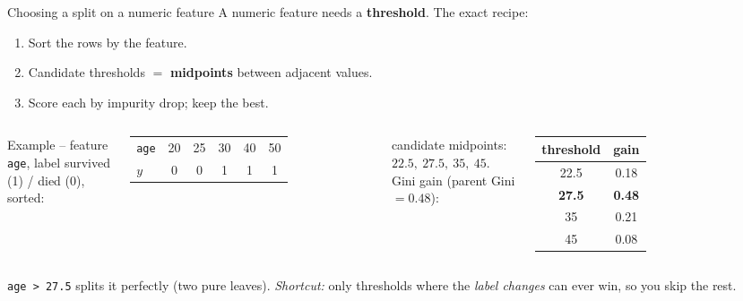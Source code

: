 \documentclass[aspectratio=169]{beamer}
\begin{document}
\begin{frame}{Choosing a split on a numeric feature}
  A numeric feature needs a \textbf{threshold}. The exact recipe:
  \begin{enumerate}\small
    \item Sort the rows by the feature.
    \item Candidate thresholds $=$ \textbf{midpoints} between adjacent values.
    \item Score each by impurity drop; keep the best.
  \end{enumerate}
  \vskip 2pt
  \begin{columns}[T]
    \small Example -- feature \texttt{age}, label survived (1) / died (0), sorted:
    \vskip 3pt
    \begin{tabular}{l c c c c c}
      \texttt{age} & 20 & 25 & 30 & 40 & 50 \\
      $y$ & 0 & 0 & 1 & 1 & 1 \\
    \end{tabular}
    \vskip 5pt
    candidate midpoints: $22.5,\ \mathbf{27.5},\ 35,\ 45$.
    \small Gini gain (parent Gini $= 0.48$):
    \vskip 3pt
    \renewcommand{\arraystretch}{1.15}
    \begin{tabular}{c c}
      threshold & gain \\
      \hline
      22.5 & 0.18 \\
      \textbf{27.5} & \textbf{0.48} \\
      35 & 0.21 \\
      45 & 0.08 \\
      \hline
    \end{tabular}
  \end{columns}
  \vfill
  \footnotesize \texttt{age > 27.5} splits it perfectly (two pure leaves).
  \emph{Shortcut:} only thresholds where the \emph{label changes} can ever win, so you
  skip the rest.
\end{frame}
\end{document}

